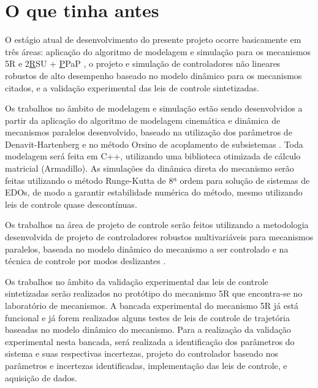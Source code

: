 \documentclass[]{politex}
\begin{document}
\section{O que tinha antes} 
O estágio atual de desenvolvimento do presente projeto ocorre basicamente em três áreas:
aplicação do algoritmo de modelagem e simulação para os mecanismos 5R \cite{22orsino} e 2\underline{R}SU + \underline{P}PaP \cite{Kumazawa}, o projeto e simulação de controladores não lineares robustos de alto desempenho baseado no modelo dinâmico para os mecanismos citados, e a validação experimental das leis de controle sintetizadas.

Os trabalhos no âmbito de modelagem e simulação estão sendo desenvolvidos a partir da aplicação do algoritmo de modelagem cinemática e dinâmica de mecanismos paralelos desenvolvido, baseado na utilização dos parâmetros de Denavit-Hartenberg \cite{Craig, Denavit, Lipkin} e no método Orsino de acoplamento de subsistemas \cite{23orsino}. Toda modelagem será feita em C++, utilizando uma biblioteca otimizada de cálculo matricial (Armadillo).
As simulações da dinâmica direta do mecanismo serão feitas utilizando o método Runge-Kutta de 8ª ordem \cite{RK} para solução de sistemas de EDOs, de modo a garantir estabilidade numérica do método, mesmo utilizando leis de controle quase descontínuas.

Os trabalhos na área de projeto de controle serão feitos utilizando a metodologia desenvolvida de projeto de controladores robustos multivariáveis para mecanismos paralelos, baseada no modelo dinâmico do mecanismo a ser controlado e na técnica de controle por modos deslizantes \cite{Slotini, Utkin}.

Os trabalhos no âmbito da validação experimental das leis de controle sintetizadas serão realizados no protótipo do mecanismo 5R que encontra-se no laboratório de mecanismos. A bancada experimental do mecanismo 5R já está funcional e já forem realizados alguns testes de leis de controle de trajetória baseadas no modelo dinâmico do mecanismo. Para a realização da validação experimental nesta bancada, será realizada a identificação dos parâmetros do sistema e suas respectivas incertezas, projeto do controlador baseado nos parâmetros e incertezas identificadas, implementação das leis de controle, e aquisição de dados. \\
\end{document}
